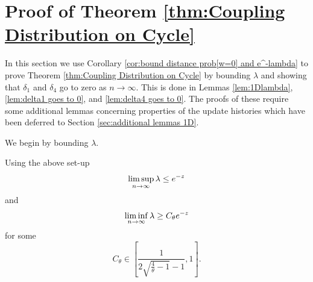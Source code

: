 	\section{Proof of Theorem \ref{thm:Coupling Distribution on Cycle}}
	\label{sec:proof thm coupling cycle}
	In this section we use Corollary \ref{cor:bound distance prob[w=0] and e^-lambda} to prove Theorem \ref{thm:Coupling Distribution on Cycle} by bounding $\lambda$ and showing that $\delta_1$ and $\delta_4$ go to zero as $n \rightarrow \infty$. This is done in Lemmas \ref{lem:1Dlambda}, \ref{lem:delta1 goes to 0}, and \ref{lem:delta4 goes to 0}. The proofs of these require some additional lemmas concerning properties of the update histories which have been deferred to Section \ref{sec:additional lemmas 1D}.

	We begin by bounding $\lambda$.
	\begin{lemma}
	\label{lem:1Dlambda}
		Using the above set-up
		\begin{equation}
			\limsup_{n \rightarrow \infty} \lambda \leq e^{-z}
		\end{equation}
		and
		\begin{equation}
			\liminf_{n \rightarrow \infty} \lambda \geq C_\theta e^{-z}
		\end{equation}
		for some
		\begin{equation}
			C_\theta \in \left[\frac{1}{2\sqrt{\frac{4}{\theta} - 1} - 1}, 1\right].
		\end{equation}
	\end{lemma}
